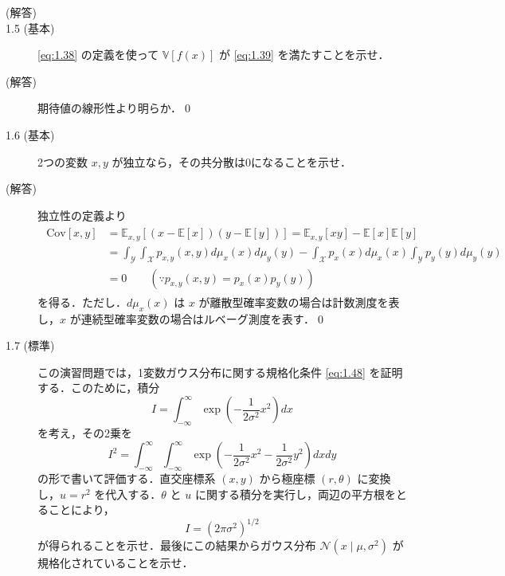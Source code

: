 \documentclass[uplatex,a4paper,oneside,openany,dvipdfmx]{jsarticle}
\numberwithin{equation}{section}
\theoremstyle{mystyle} %
\newcommand{\BE}{\mathbb{E}}
\newcommand{\BV}{\mathbb{V}}
\newcommand{\CN}{\mathcal{N}}
\newcommand{\CX}{\mathcal{X}}
\newcommand{\CY}{\mathcal{Y}}
\newcommand{\cov}[1]{\mathrm{Cov}[#1]}
\begin{document}
\begin{description}
\item[(解答)] 

\item[1.5 (基本)] \eqref{eq:1.38} の定義を使って $\BV[f(x)]$ が \eqref{eq:1.39} を満たすことを示せ．

\item[(解答)] 期待値の線形性より明らか．\qed

\item[1.6 (基本)] 2つの変数 $x,y$ が独立なら，その共分散は0になることを示せ．

\item[(解答)] 独立性の定義より
\begin{align}
    \begin{aligned}
        \cov{x,y} &= \BE_{x,y}[(x - \BE[x])(y - \BE[y])] = \BE_{x,y}[xy] - \BE[x]\BE[y] \\
        &= \int_{\CY} \int_{\CX} p_{x,y}(x,y) d\mu_{x}(x) d\mu_{y}(y) - \int_{\CX} p_{x}(x) d\mu_{x}(x) \int_{\CY} p_{y}(y) d\mu_{y}(y) \\
        &= 0 \qquad (\because p_{x,y}(x,y) = p_{x}(x)p_{y}(y))
    \end{aligned}
\end{align}
を得る．ただし．$d\mu_{x}(x)$ は $x$ が離散型確率変数の場合は計数測度を表し，$x$ が連続型確率変数の場合はルベーグ測度を表す．\qed

\item[1.7 (標準)]  この演習問題では，1変数ガウス分布に関する規格化条件 \eqref{eq:1.48} を証明する．このために，積分
\begin{equation} \label{eq:1.124}
    I = \int_{-\infty}^{\infty} \exp{\left(-\frac{1}{2\sigma^{2}}x^{2}\right)} dx
\end{equation}
を考え，その2乗を
\begin{equation} \label{eq:1.125}
    I^{2} = \int_{-\infty}^{\infty} \int_{-\infty}^{\infty} \exp{\left(-\frac{1}{2\sigma^{2}}x^{2}-\frac{1}{2\sigma^{2}}y^{2}\right)} dx dy
\end{equation}
の形で書いて評価する．直交座標系 $(x,y)$ から極座標 $(r,\theta)$ に変換し，$u = r^{2}$ を代入する．$\theta$ と $u$ に関する積分を実行し，両辺の平方根をとることにより，
\begin{equation} \label{eq:1.126}
    I = (2\pi\sigma^{2})^{1/2}
\end{equation}
が得られることを示せ．最後にこの結果からガウス分布 $\CN(x \mid \mu,\sigma^{2})$ が規格化されていることを示せ．


\end{description}
\end{document}
